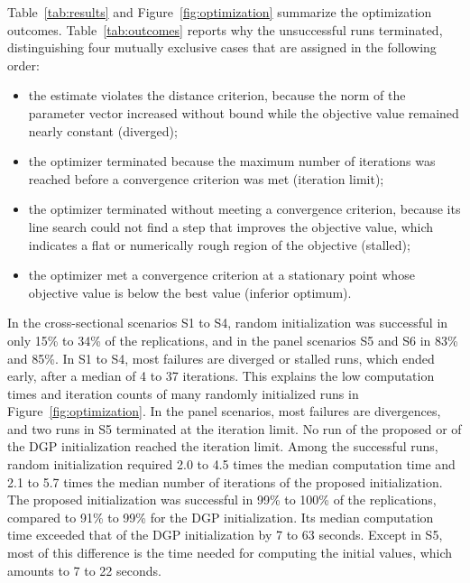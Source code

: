 \documentclass[preprint,12pt,authoryear]{elsarticle}
\begin{document}
\begin{table}[t]
    \centering
    \caption{Optimization outcomes. (a) Success rates over 100 replications. (b) Medians of the total computation time in seconds, including initialization. (c) Number of iterations among successful runs.}
    \label{tab:results}
    \resizebox{\textwidth}{!}{}
\end{table}

\begin{table}[t]
    \centering
    \caption{Reason for termination. Number of runs among 100 replications per scenario and initialization.}
    \label{tab:outcomes}
    \small
    
\end{table}

Table~\ref{tab:results} and Figure~\ref{fig:optimization} summarize the optimization outcomes. Table~\ref{tab:outcomes} reports why the unsuccessful runs terminated, distinguishing four mutually exclusive cases that are assigned in the following order:
\begin{itemize}
    \item the estimate violates the distance criterion, because the norm of the parameter vector increased without bound while the objective value remained nearly constant (diverged);
    \item the optimizer terminated because the maximum number of iterations was reached before a convergence criterion was met (iteration limit);
    \item the optimizer terminated without meeting a convergence criterion, because its line search could not find a step that improves the objective value, which indicates a flat or numerically rough region of the objective (stalled);
    \item the optimizer met a convergence criterion at a stationary point whose objective value is below the best value (inferior optimum).
\end{itemize}
In the cross-sectional scenarios S1 to S4, random initialization was successful in only 15\% to 34\% of the replications, and in the panel scenarios S5 and S6 in 83\% and 85\%. In S1 to S4, most failures are diverged or stalled runs, which ended early, after a median of 4 to 37 iterations. This explains the low computation times and iteration counts of many randomly initialized runs in Figure~\ref{fig:optimization}. In the panel scenarios, most failures are divergences, and two runs in S5 terminated at the iteration limit. No run of the proposed or of the DGP initialization reached the iteration limit. Among the successful runs, random initialization required 2.0 to 4.5 times the median computation time and 2.1 to 5.7 times the median number of iterations of the proposed initialization. The proposed initialization was successful in 99\% to 100\% of the replications, compared to 91\% to 99\% for the DGP initialization. Its median computation time exceeded that of the DGP initialization by 7 to 63 seconds. Except in S5, most of this difference is the time needed for computing the initial values, which amounts to 7 to 22 seconds.
\end{document}
